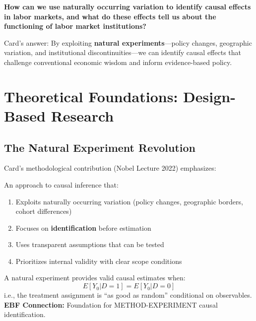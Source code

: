 \begin{tcolorbox}[colback=red!5!white, colframe=red!75!black, title=Central Question]
\textbf{How can we use naturally occurring variation to identify causal effects in labor markets, and what do these effects tell us about the functioning of labor market institutions?}
\end{tcolorbox}

Card's answer: By exploiting \textbf{natural experiments}---policy changes, geographic variation, and institutional discontinuities---we can identify causal effects that challenge conventional economic wisdom and inform evidence-based policy.

\section{Theoretical Foundations: Design-Based Research}

\subsection{The Natural Experiment Revolution}

Card's methodological contribution (Nobel Lecture 2022) emphasizes:

\begin{definition}
An approach to causal inference that:
\begin{enumerate}
    \item Exploits naturally occurring variation (policy changes, geographic borders, cohort differences)
    \item Focuses on \textbf{identification} before estimation
    \item Uses transparent assumptions that can be tested
    \item Prioritizes internal validity with clear scope conditions
\end{enumerate}
\end{definition}

\begin{axiom}
\label{ax:dc1}
A natural experiment provides valid causal estimates when:
\begin{equation}
E[Y_0 | D=1] = E[Y_0 | D=0]
\end{equation}
i.e., the treatment assignment is ``as good as random'' conditional on observables.
\textbf{EBF Connection:} Foundation for METHOD-EXPERIMENT causal identification.
\end{axiom}

